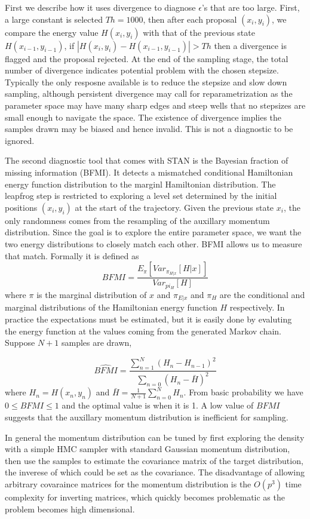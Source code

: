 \documentclass{book}
\begin{document}
\begin{enumerate}
First we describe how it uses
divergence to diagnose $\epsilon$'s that are too large. First, a large constant
is selected $Th = 1000$, then after each proposal $(x_i,y_i)$, we compare the
energy value $H(x_i,y_i)$ with that of the previous state $H(x_{i-1},y_{i-1})$,
if $|H(x_i,y_i) - H(x_{i-1},y_{i-1})|> Th$ then a divergence is flagged and the
proposal rejected. At the end of the sampling stage, the total number of
divergence indicates potential problem with the chosen stepsize. Typically the
only resposne available is to reduce the stepsize and slow down sampling,
although persistent divergence may call for reparametrization as the parameter
space may have many sharp edges and steep wells that no stepsizes are small
enough to navigate the space. The existence of divergence implies the samples
drawn may be biased and hence invalid. This is not a diagnostic to be ignored.

The second diagnostic tool that comes with STAN is the Bayesian fraction of
missing information (BFMI). It detects a mismatched conditional Hamiltonian
energy function
distribution to the marginl Hamiltonian distribution. The leapfrog step is
restricted to exploring a level set determined by the 
initial positions $(x_i,y_i)$ at the start of the trajectory. Given the previous
state $x_i$, the only randomness comes from the resampling of the auxillary
momentum distribution. Since the goal is
to explore the entire parameter space, we want the two energy distributions to
closely match each other. BFMI allows us to measure that match. Formally it is defined as 
\[ BFMI = \frac{ E_\pi[Var_{\pi_{H|x}}[H|x]]}{Var_{pi_H}[H]} \]
where $\pi$ is the marginal distribution of $x$ and $\pi_{E|x}$ and $\pi_{H}$
are the conditional and marginal distributions of the Hamiltonian energy
function $H$ respectively. In practice the expectations must be estimated, but
it is easily done by evaluting the energy function at the values coming from the
generated Markov chain. Suppose $N+1$ samples are drawn, 

\[ \hat{BFMI} = \frac{\sum_{n=1}^N(H_n-H_{n-1})^2}{\sum_{n=0}(H_n-\bar{H})^2} \]
where $H_n = H(x_n,y_n)$ and $\bar{H}=\frac{1}{N+1}\sum_{n=0}^N H_n$. From basic
probability we have $0 \le BFMI \le 1 $ and the optimal value is when it is
1. A low value of $BFMI$ suggests that the auxillary momentum distribution is
inefficient for sampling. 


In general the momentum distribution can be tuned by first exploring the density
with a simple HMC sampler with standard Gaussian momentum distribution, then use
the samples to estimate the covariance matrix of the target distribution, the
inverese of which could be set as the covariance. The disadvantage of allowing
arbitrary covaraince matrices for the momentum distribution is the $O(p^3)$ time
complexity for inverting matrices, which quickly becomes problematic as the
problem becomes high dimensional. 



\end{enumerate}
\end{document}
